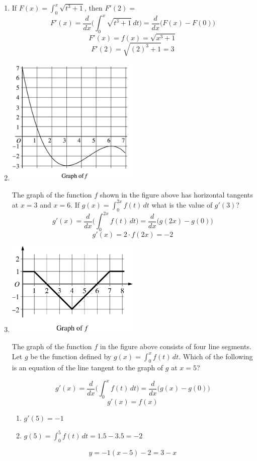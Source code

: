 \documentclass[12pt]{article}
\begin{document}
\begin{enumerate}
    
    \item If $F(x)=\int_{0}^{x} \sqrt{t^3+1} $, then $F'(2)=$
    $$F'(x)=\frac{d}{dx}\biggr( \int_{0}^{x} \sqrt{t^3+1} \, dt \biggr) = \frac{d}{dx}\biggr( F(x)-F(0) \biggr)$$ 
$$F'(x)=f(x)=\sqrt{x^3+1}$$
$$F'(2)=\sqrt{(2)^3+1}=\boxed{3}$$
\newpage
    \item 
     \begin{center}
        \includegraphics[width=2.5in]{original-17.png}
    \end{center}
    The graph of the function $f$ shown in the figure above has horizontal tangents at $x = 3$ and $x = 6$. If $g(x)=\int_{0}^{2x} f(t) \, dt$ what is the value of $g'(3)$?
    $$g'(x)=\frac{d}{dx}\biggr( \int_{0}^{2x} f(t) \, dt \biggr) = \frac{d}{dx}\biggr( g(2x)-g(0) \biggr)$$ 
    $$g'(x)= 2 \cdot f(2x) = \boxed{-2}$$
    \item 
    \begin{center}
        \includegraphics[width=2.5in]{original-18.png}
    \end{center}
    The graph of the function $f$ in the figure above consists of four line segments. Let $g$ be the function defined by $g(x)=\int_{0}^{x} f(t) \, dt$. Which of the following is an equation of the line tangent to the graph of $g$ at $x=5$?
    
    $$g'(x)=\frac{d}{dx}\biggr( \int_{0}^{x} f(t) \, dt \biggr) = \frac{d}{dx}\biggr( g(x)-g(0) \biggr)$$ 
    $$g'(x)= f(x) $$
    \begin{enumerate}
        \item $g'(5)=-1$
        \item $g(5)=\int_0^5 f(t) \, dt = 1.5-3.5=-2$
    \end{enumerate}
    $$y=-1(x-5)-2=\boxed{3-x}$$
\end{enumerate}
\end{document}
